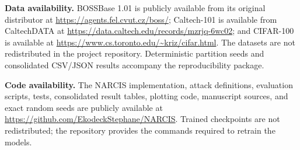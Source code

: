 ﻿\documentclass[a4paper,fleqn]{cas-dc}
\begin{document}
\medskip
\noindent\textbf{Data availability.}
BOSSBase 1.01 is publicly available from its original distributor at
\url{https://agents.fel.cvut.cz/boss/}; Caltech-101 is available from
CaltechDATA at \url{https://data.caltech.edu/records/mzrjq-6wc02}; and
CIFAR-100 is available at
\url{https://www.cs.toronto.edu/~kriz/cifar.html}. The datasets are not
redistributed in the project repository.
Deterministic partition seeds and consolidated CSV/JSON results accompany the
reproducibility package.

\medskip
\noindent\textbf{Code availability.}
The NARCIS implementation, attack definitions, evaluation scripts, tests,
consolidated result tables, plotting code, manuscript sources, and exact
random seeds are publicly available at
\url{https://github.com/EkodeckStephane/NARCIS}. Trained checkpoints are not
redistributed; the repository provides the commands required to retrain the
models.

\FloatBarrier


\end{document}
